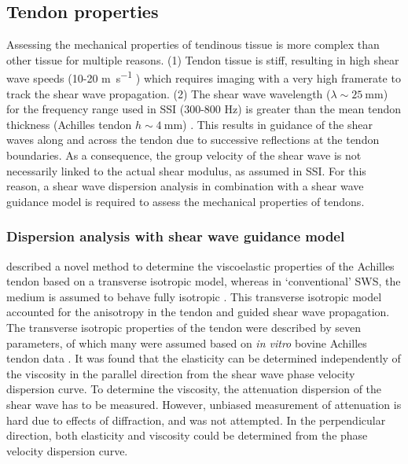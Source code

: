 



\subsection{Tendon properties}
Assessing the mechanical properties of tendinous tissue is more complex than other tissue for multiple reasons. (1) Tendon tissue is stiff, resulting in high shear wave speeds (10-20 \si{\meter\per\second} \cite{cortes_continuous_2015, helfenstein-didier_vivo_2016}) which requires imaging with a very high framerate to track the shear wave propagation. (2) The shear wave wavelength ($\lambda {\sim}\SI{25}{\milli\meter}$) for the frequency range used in SSI (300-800 \si{\hertz}) is greater than the mean tendon thickness (Achilles tendon $h{\sim}\SI{4}{\milli\meter}$) \cite{brum_vivo_2014}. This results in guidance of the shear waves along and across the tendon due to successive reflections at the tendon boundaries. As a consequence, the group velocity of the shear wave is not necessarily linked to the actual shear modulus, as assumed in SSI. For this reason, a shear wave dispersion analysis in combination with a shear wave guidance model is required to assess the mechanical properties of tendons. 

\subsubsection{Dispersion analysis with shear wave guidance model}
\citeauthor{brum_vivo_2014} described a novel method to determine the viscoelastic properties of the Achilles tendon based on a transverse isotropic model, whereas in `conventional' SWS, the medium is assumed to behave fully isotropic \cite{brum_vivo_2014}. This transverse isotropic model accounted for the anisotropy in the tendon and guided shear wave propagation. The transverse isotropic properties of the tendon were described by seven parameters, of which many were assumed based on \textit{in vitro} bovine Achilles tendon data \cite{kuo_elastic_2001}. It was found that the elasticity can be determined independently of the viscosity in the parallel direction from the shear wave phase velocity dispersion curve. To determine the viscosity, the attenuation dispersion of the shear wave has to be measured. However, unbiased measurement of attenuation is hard due to effects of diffraction, and was not attempted. In the perpendicular direction, both elasticity and viscosity could be determined from the phase velocity dispersion curve. 

